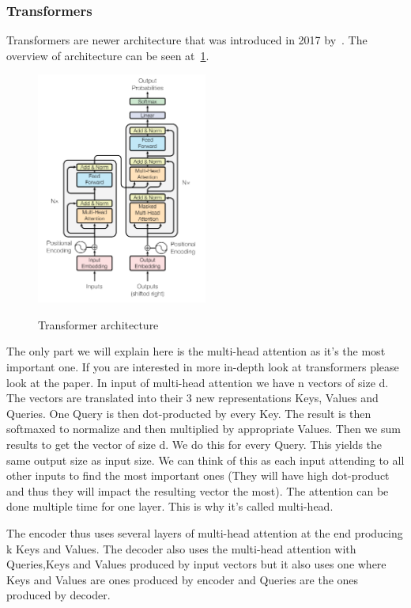 \documentclass{article}
\begin{document}
    \subsubsection{Transformers}
    Transformers are newer architecture that was introduced in 2017 by~\cite{vaswaniAttentionAllYou2017b}.
    The overview of architecture can be seen at~\ref{fig:transformer}.
    \begin{figure}[h!]
        \centering
        \includegraphics[width=0.5\textwidth]{attention.png}\cite{vaswaniAttentionAllYou2017b}\label{fig:transformer}
        \caption{Transformer architecture}
    \end{figure}
    The only part we will explain here is the multi-head attention as it's the most important one.
    If you are interested in more in-depth look at transformers please look at the paper.
    In input of multi-head attention we have n vectors of size d. The vectors are translated into their 3 new representations Keys, Values and Queries.
    One Query is then dot-producted by every Key. The result is then softmaxed to normalize and then multiplied by appropriate Values.
    Then we sum results to get the vector of size d. We do this for every Query.
    This yields the same output size as input size. We can think of this as each input attending to all other inputs to find the most important ones (They will have high dot-product and thus they will impact the resulting vector the most).
    The attention can be done multiple time for one layer. This is why it's called multi-head.

    The encoder thus uses several layers of multi-head attention at the end producing k Keys and Values.
    The decoder also uses the multi-head attention with Queries,Keys and Values produced by input vectors but it also uses one
    where Keys and Values are ones produced by encoder and Queries are the ones produced by decoder.
\end{document}
